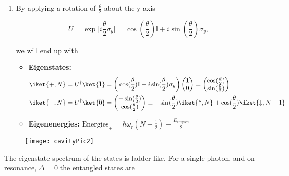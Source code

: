 \begin{enumerate}
\item By applying a rotation of $ \frac{\theta}{2} $ about the y-axis

  \[
    U         =          \exp\big[i\frac{\theta}{2}\sigma_y\big]         =
    \cos(\frac{\theta}{2})\mathbb{I} + i\sin(\frac{\theta}{2})\sigma_y,
  \]

  \noindent we will end up with

  \begin{framed}\noindent
    \begin{itemize}
    \item \textbf{Eigenstates:}
      \[
        \begin{aligned}
          \iket{+,N}       &      =       U^{\dagger}\ket{\tilde{1}}      =
          \bigg(\cos(\frac{\theta}{2})\mathbb{I}-i\sin(\frac{\theta}{2})\sigma_y\bigg)
          \begin{pmatrix}1\\0 \end{pmatrix} =
          \begin{pmatrix} \cos(\frac{\theta}{2})\\\sin(\frac{\theta}{2})\end{pmatrix} \\
          \iket{-,N}  &  =   U^{\dagger}\ket{\tilde{0}}  =  \begin{pmatrix}
            -\sin(\frac{\theta}{2})\\\cos(\frac{\theta}{2})
          \end{pmatrix} \equiv -\sin(\frac{\theta}{2})\iket{\uparrow,N} + \cos(\frac{\theta}{2})\iket{\downarrow,N+1}\\
        \end{aligned}
      \]
    \item                \textbf{Eigenenergies:}               \hfill
      $  \text{Energies}_{\pm}   =  \hbar\omega_r(N+\frac{1}{2})  \pm
      \frac{E_\text{coupled}}{2} $
    \end{itemize}
  \end{framed}

\end{enumerate}

\begin{figure}[h]
  \centering \texttt{[image: cavityPic2]}
\end{figure}

\noindent

\noindent  The  eigenstate spectrum  of  the   states  is
ladder-like.  For a  single photon, and on  resonance, $ \Delta =  0 $ the
entangled states are

